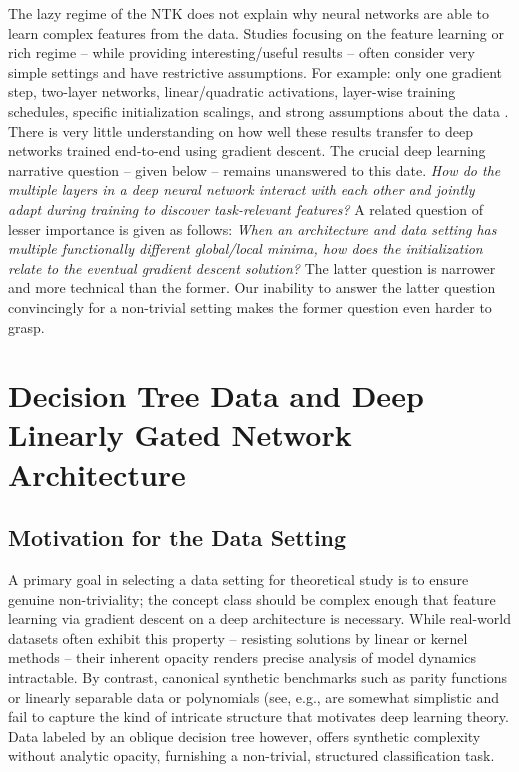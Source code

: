 \documentclass{article}
\theoremstyle{plain}
\theoremstyle{definition}
\theoremstyle{remark}
\newcommand{\1}{{\mathbf 1}}
\newcommand{\0}{{\mathbf 0}}
\renewcommand{\>}{{\rightarrow}}
\begin{document}
The lazy regime of the NTK \cite{Chizat+19} does not explain why neural networks are able to learn complex features from the data. Studies focusing on the feature learning or rich regime -- while providing interesting/useful results -- often consider very simple settings and have restrictive assumptions. For example: only one gradient step, two-layer networks, linear/quadratic activations, layer-wise training schedules, specific initialization scalings, and strong assumptions about the data \cite{Cui+24, Dandi+24, Ba+22, Damian+22, Daniely+20, Abbe+22b}. There is very little understanding on how well these results transfer to deep networks trained end-to-end using gradient descent. The crucial deep learning narrative question -- given below -- remains unanswered to this date. \textit{How do the multiple layers in a deep neural network interact with each other and jointly adapt during training to discover task-relevant features?} A related question of lesser importance is given as follows: \textit{When an architecture and data setting has multiple functionally different global/local minima, how does the initialization relate to the eventual gradient descent solution?} The latter question is  narrower and more technical than the former. Our inability to answer the latter question convincingly for a non-trivial setting makes the former question even harder to grasp.

\section{Decision Tree Data and Deep Linearly Gated Network Architecture}

\subsection{ Motivation for the Data Setting}

A primary goal in selecting a data setting for theoretical study is to ensure genuine non-triviality; the concept class should be complex enough that feature learning via gradient descent on a deep architecture is necessary. While real-world datasets often exhibit this property -- resisting solutions by linear or kernel methods -- their inherent opacity renders precise analysis of model dynamics intractable. By contrast, canonical synthetic benchmarks such as parity functions or linearly separable data or polynomials (see, e.g., \cite{Daniely+20, Frei+23, Soudry+18, Wu+23, Abbe+21} are somewhat simplistic and fail to capture the kind of intricate structure that motivates deep learning theory. Data labeled by an oblique decision tree \cite{Banerjee+25} however, offers synthetic complexity without analytic opacity, furnishing a non-trivial, structured classification task.
\end{document}
